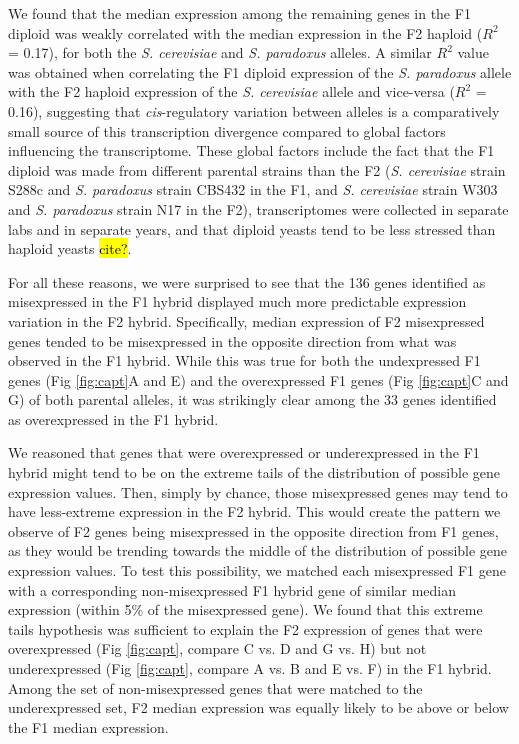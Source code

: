 We found that the median expression among the remaining genes in the F1 diploid was weakly correlated with the median expression in the F2 haploid ($R^2$ = 0.17), for both the \textit{S. cerevisiae} and \textit{S. paradoxus} alleles. A similar $R^2$ value was obtained when correlating the F1 diploid expression of the \textit{S. paradoxus} allele with the F2 haploid expression of the \textit{S. cerevisiae} allele and vice-versa ($R^2$ = 0.16), suggesting that \textit{cis}-regulatory variation between alleles is a comparatively small source of this transcription divergence compared to global factors influencing the transcriptome. These global factors include the fact that the F1 diploid was made from different parental strains than the F2 (\textit{S. cerevisiae} strain S288c and \textit{S. paradoxus} strain CBS432 in the F1, and \textit{S. cerevisiae} strain W303 and \textit{S. paradoxus} strain N17 in the F2), transcriptomes were collected in separate labs and in separate years, and that diploid yeasts tend to be less stressed than haploid yeasts \hl{cite?}.

For all these reasons, we were surprised to see that the 136 genes identified as misexpressed in the F1 hybrid displayed much more predictable expression variation in the F2 hybrid. Specifically, median expression of F2 misexpressed genes tended to be misexpressed in the opposite direction from what was observed in the F1 hybrid. While this was true for both the undexpressed F1 genes (Fig \ref{fig:capt}A and E) and the overexpressed F1 genes (Fig \ref{fig:capt}C and G) of both parental alleles, it was strikingly clear among the 33 genes identified as overexpressed in the F1 hybrid.

We reasoned that genes that were overexpressed or underexpressed in the F1 hybrid might tend to be on the extreme tails of the distribution of possible gene expression values. Then, simply by chance, those misexpressed genes may tend to have less-extreme expression in the F2 hybrid. This would create the pattern we observe of F2 genes being misexpressed in the opposite direction from F1 genes, as they would be trending towards the middle of the distribution of possible gene expression values. To test this possibility, we matched each misexpressed F1 gene with a corresponding non-misexpressed F1 hybrid gene of similar median expression (within 5\% of the misexpressed gene). We found that this extreme tails hypothesis was sufficient to explain the F2 expression of genes that were overexpressed (Fig \ref{fig:capt}, compare C vs. D and G vs. H) but not underexpressed (Fig \ref{fig:capt}, compare A vs. B and E vs. F) in the F1 hybrid. Among the set of non-misexpressed genes that were matched to the underexpressed set, F2 median expression was equally likely to be above or below the F1 median expression.


